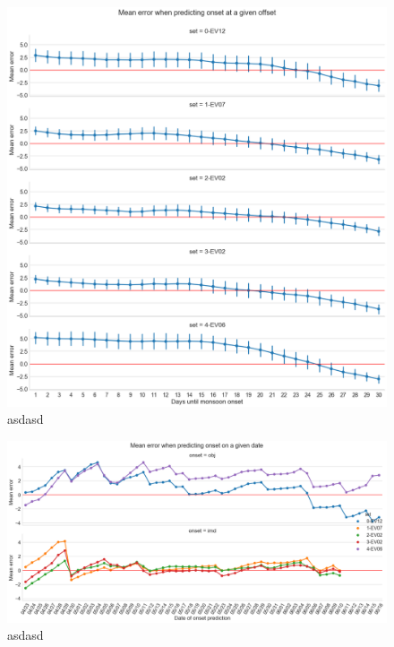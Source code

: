 \begin{figure}[h]
  \centering
  \includegraphics[width=\linewidth]{./99_appendix/img/prediction_error_offset_split.png}
  \caption{asdasd}
  \label{apx:prediction_error_offset_ci}
\end{figure}

\begin{figure}[h]
  \centering
  \includegraphics[width=\linewidth]{./99_appendix/img/prediction_error_dates.png}
  \caption{asdasd}
  \label{apx:prediction_error_dates_ci}
\end{figure}

